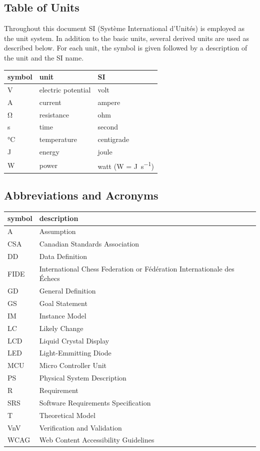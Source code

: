 \documentclass[12pt]{article}
\begin{document}
\subsection{Table of Units}
Throughout this document SI (Syst\`{e}me International d'Unit\'{e}s) is employed
as the unit system.  In addition to the basic units, several derived units are
used as described below.  For each unit, the symbol is given followed by a
description of the unit and the SI name.

\begin{table}[ht]
  \noindent \begin{tabular}{l l l} 
    \toprule		
    \textbf{symbol} & \textbf{unit} & \textbf{SI}\\
    \midrule 
    \si{\volt} & electric potential & volt\\
    \si{\ampere} & current	& ampere\\
    \si{\ohm} & resistance	& ohm\\
    \si{\second} & time & second\\
    \si{\celsius} & temperature & centigrade\\
    \si{\joule} & energy & joule\\
    \si{\watt} & power & watt (W = \si{\joule\per\second})\\
    \bottomrule
  \end{tabular}
\end{table}

\newpage

\subsection{Abbreviations and Acronyms}
\begin{tabular}{l l} 
  \toprule		
  \textbf{symbol} & \textbf{description}\\
  \midrule 
  A & Assumption\\
  CSA & Canadian Standards Association\\
  DD & Data Definition\\
  FIDE & International Chess Federation or Fédération Internationale des Échecs\\
  GD & General Definition\\
  GS & Goal Statement\\
  IM & Instance Model\\
  LC & Likely Change\\
  LCD & Liquid Crystal Display\\
  LED & Light-Emmitting Diode\\
  MCU & Micro Controller Unit\\
  PS & Physical System Description\\
  R & Requirement\\
  SRS & Software Requirements Specification\\
  T & Theoretical Model\\
  VnV & Verification and Validation\\
  WCAG & Web Content Accessibility Guidelines\\
  \bottomrule
\end{tabular}\\
\end{document}
